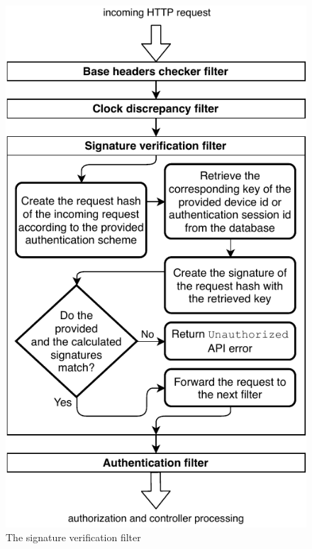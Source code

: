 \begin{figure}[!htb]
    \includegraphics[width=\textwidth]{figures/signature-verification-filter.pdf}
    \caption{The signature verification filter}
    \label{fig:signature-verification-filter}
\end{figure}

